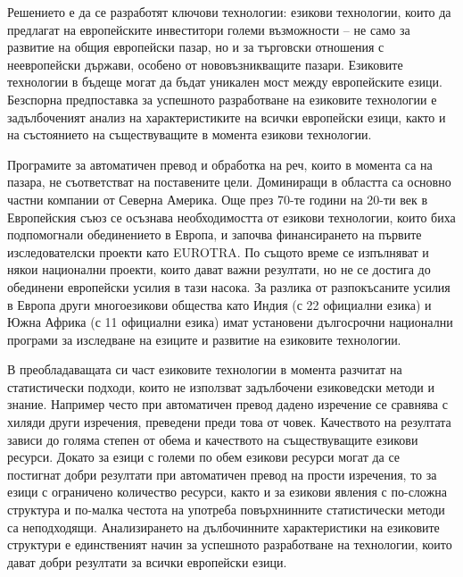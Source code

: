 \begin{multicols}{2}
  Решението е да се разработят ключови технологии: езикови технологии, които да предлагат на европейските инвеститори големи възможности – не само за развитие на общия европейски пазар, но и за търговски отношения с неевропейски държави, особено от нововъзникващите пазари. Езиковите технологии в бъдеще могат да бъдат уникален мост между европейските езици. Безспорна предпоставка за успешното разработване на езиковите технологии е задълбоченият анализ на характеристиките на всички европейски езици, както и на състоянието на съществуващите в момента езикови технологии.

  Програмите за автоматичен превод и обработка на реч, които в момента са на пазара, не съответстват на поставените цели. Доминиращи в областта са основно частни компании от Северна Америка. Още през 70-те години на 20-ти век в Европейския съюз се осъзнава необходимостта от езикови технологии, които биха подпомогнали обединението в Европа, и започва финансирането на първите изследователски проекти като EUROTRA. По същото време се изпълняват и някои национални проекти, които дават важни резултати, но не се достига до обединени европейски усилия в тази насока. За разлика от разпокъсаните усилия в Европа други многоезикови общества като Индия (с 22 официални езика) и Южна Африка (с 11 официални езика) имат установени дългосрочни национални програми за изследване на езиците и развитие на езиковите технологии.

  В преобладаващата си част езиковите технологии в момента разчитат на статистически подходи, които не използват задълбочени езиковедски методи и знание. Например често при автоматичен превод дадено изречение се сравнява с хиляди други изречения, преведени преди това от човек. Качеството на резултата зависи до голяма степен от обема и качеството на съществуващите езикови ресурси. Докато за езици с големи по обем езикови ресурси могат да се постигнат добри резултати при автоматичен превод на прости изречения, то за езици с ограничено количество ресурси, както и за езикови явления с по-сложна структура и по-малка честота на употреба повърхнинните статистически методи са неподходящи. Анализирането на дълбочинните характеристики на езиковите структури е единственият начин за успешното разработване на технологии, които дават добри резултати за всички европейски езици.



\end{multicols}
